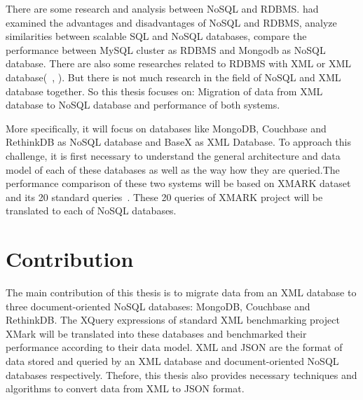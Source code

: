 	\par		
	There are some research and analysis between NoSQL and RDBMS. \citet{nance2013nosql} had examined the advantages and disadvantages of NoSQL and RDBMS, \cite{cattell2011scalable} analyze similarities between scalable SQL and NoSQL databases, \cite{hadjigeorgiou2013rdbms}  compare the performance between MySQL cluster as RDBMS and Mongodb as NoSQL database.  There are also some researches related to RDBMS with XML or XML database(~\citet{jiang2002xparent}, \citet{shanmugasundaram1999relational}). But there is not much research in the field of NoSQL and XML database together. So this thesis focuses on: Migration of data from XML database to NoSQL database and  performance of both systems.	

\par 
More specifically, it will focus on databases like MongoDB, Couchbase and RethinkDB as NoSQL database and BaseX as XML Database. To approach this challenge, it is first necessary to understand the general architecture and data model of each of these databases as well as the way how they are queried.The performance comparison of these two systems will be based on XMARK dataset and its 20 standard queries~\citep{xmark/original}. These 20 queries of XMARK project will be translated to each of NoSQL databases.
	
	\section{Contribution}
		The main contribution of this thesis is to migrate data from an XML database to three document-oriented  NoSQL databases: MongoDB, Couchbase and RethinkDB. The XQuery expressions of standard XML benchmarking project XMark will be  translated  into these databases and benchmarked their performance according to their data model. XML and JSON are the format of data stored and queried by an XML database and document-oriented NoSQL databases respectively. Thefore, this thesis also provides necessary techniques and algorithms to convert data from XML to JSON format.
	    
		
